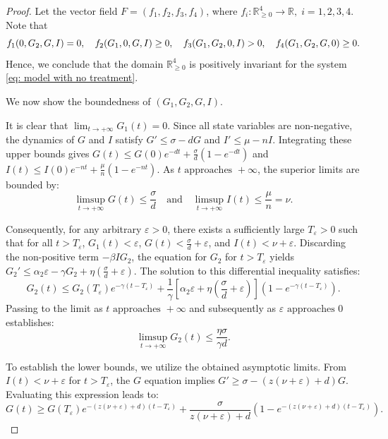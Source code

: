 \documentclass[a4paper,fleqn]{cas-sc}
\numberwithin{equation}{section}
\numberwithin{equation}{section}
\newcommand{\1}{\boldsymbol{1}}
\newcommand{\0}{\boldsymbol{0}}
\begin{document}
\begin{proof}
    Let the vector field $F = (f_1,f_2,f_3,f_4)$, where $f_i: \mathbb{R}^4_{\geq 0} \to \mathbb{R}, \; i =1,2,3,4$. Note that
    \[
        f_1(0,G_2,G,I) = 0, \quad  f_2(G_1,0,G,I) \geq 0, \quad f_3(G_1,G_2,0,I) > 0, \quad f_4(G_1,G_2,G,0) \geq 0. \\
    \]
    Hence, we conclude that the domain $\mathbb{R}^4_{\geq 0}$ is positively invariant for the system \eqref{eq: model with no treatment}.

    We now show the boundedness of $(G_1, G_2, G, I)$. 
    
    It is clear that $\displaystyle\lim_{t \to +\infty} G_1(t) = 0$. Since all state variables are non-negative, the dynamics of $G$ and $I$ satisfy $G' \leq \sigma - dG$ and $I' \leq \mu - nI$. Integrating these upper bounds gives $G(t) \leq G(0)e^{-dt} + \frac{\sigma}{d}(1 - e^{-dt})$ and $I(t) \leq I(0)e^{-nt} + \frac{\mu}{n}(1 - e^{-nt})$. As $t \text{ approaches } +\infty$, the superior limits are bounded by:
    \[
        \limsup_{t \to +\infty} G(t) \leq \frac{\sigma}{d} \quad \text{and} \quad \limsup_{t \to +\infty} I(t) \leq \frac{\mu}{n} = \nu.
    \]
    
    Consequently, for any arbitrary $\varepsilon > 0$, there exists a sufficiently large $T_\varepsilon > 0$ such that for all $t > T_\varepsilon$, $G_1(t) < \varepsilon$, $G(t) < \frac{\sigma}{d} + \varepsilon$, and $I(t) < \nu + \varepsilon$. Discarding the non-positive term $-\beta I G_2$, the equation for $G_2$ for $t > T_\varepsilon$ yields $G_2' \leq \alpha_2 \varepsilon - \gamma G_2 + \eta \left( \frac{\sigma}{d} + \varepsilon \right)$. The solution to this differential inequality satisfies:
    \[
        G_2(t) \leq G_2(T_\varepsilon)e^{-\gamma(t-T_\varepsilon)} + \frac{1}{\gamma}\left[\alpha_2 \varepsilon + \eta \left( \frac{\sigma}{d} + \varepsilon \right)\right]\left(1 - e^{-\gamma(t-T_\varepsilon)}\right).
    \]
    Passing to the limit as $t \text{ approaches } +\infty$ and subsequently as $\varepsilon \text{ approaches } 0$ establishes:
    \[
        \limsup_{t \to +\infty} G_2(t) \leq \frac{\eta\sigma}{\gamma d}.
    \]
    
    To establish the lower bounds, we utilize the obtained asymptotic limits. From $I(t) < \nu + \varepsilon$ for $t > T_\varepsilon$, the $G$ equation implies $G' \geq \sigma - (z(\nu + \varepsilon) + d)G$. Evaluating this expression leads to:
    \[
        G(t) \geq G(T_\varepsilon)e^{-(z(\nu + \varepsilon) + d)(t-T_\varepsilon)} + \frac{\sigma}{z(\nu + \varepsilon) + d}\left(1 - e^{-(z(\nu + \varepsilon) + d)(t-T_\varepsilon)}\right).
    \]
    

\end{proof}
\end{document}
